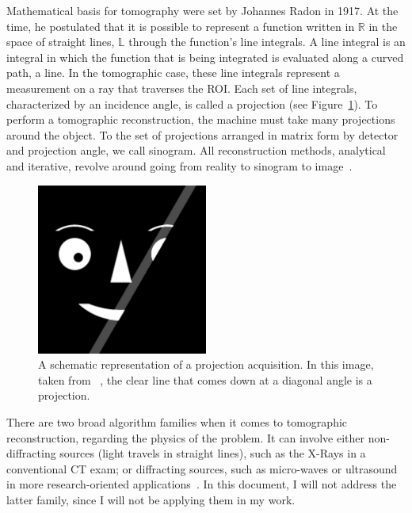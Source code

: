 Mathematical basis for tomography were set by Johannes Radon in 1917. At
the time, he postulated that  it is possible to represent a function
written in $\mathbb{R}$ in the space of straight lines, $\mathbb{L}$
through the function's line integrals. A line integral is an integral in
which the function that is being integrated is evaluated along a curved
path, a line. In the tomographic case, these line integrals represent a
measurement on a ray that traverses the \gls{ROI}.  Each set of line
integrals, characterized by an incidence angle, is called a projection
(see Figure~\ref{fig:projection}). To perform a tomographic
reconstruction, the machine must take many projections around the
object. To the set of projections arranged in matrix form by detector
and projection angle, we call sinogram. All reconstruction methods,
analytical and iterative, revolve around going from reality to sinogram
to image~\cite{Bruyant2002, Kak2001, Herman1973, Herman1995, Herman2009,
Defrise2003}.

\begin{figure}[htpb]
    \centering
    \includegraphics[width=0.5\textwidth]{img/projections.png}
    \caption{A schematic representation of a projection acquisition. In
    this image, taken from ~\cite{Herman2009}, the clear line that comes
    down at a diagonal angle is a projection.}
    \label{fig:projection}
\end{figure}

There are two broad algorithm families when it comes to tomographic
reconstruction, regarding the physics of the problem. It can involve
either non-diffracting sources (light travels in straight lines), such
as the X-Rays in a conventional \gls{CT} exam; or diffracting sources,
such as micro-waves or ultrasound in more research-oriented
applications~\cite{Kak2001}. In this document, I will not address the
latter family, since I will not be applying them in my work.

